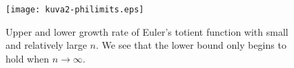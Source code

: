 \documentclass{article}
\begin{document}
\begin{figure}[!htb]
    \centering
    \texttt{[image: kuva2-philimits.eps]}
    \caption{Upper and lower growth rate of Euler's totient function with small and relatively large $n$. We see that the lower bound only begins to hold when $n\rightarrow\infty$.}
    \label{fig:k2}
\end{figure}

\clearpage
\nocite{*}
\printbibliography
\end{document}
